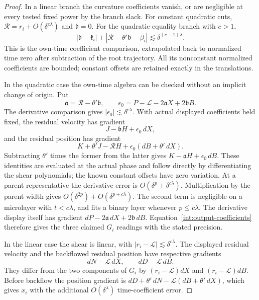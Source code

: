 \begin{proof}
In a linear branch the curvature coefficients vanish, or are
negligible at every tested fixed power by the branch slack. For
constant quadratic cuts,
$\mathcal R=r_i+O(\delta^{c\lambda})$ and $\mathfrak b=0$.
For the quadratic equality branch with $c>1$,
\begin{equation}\label{int:output-coefficients}
 |\mathfrak b-\mathfrak k_i|+
 |\mathcal R-\theta'\mathfrak b-\beta_i|
 \lesssim\delta^{(c-1)\lambda}.
\end{equation}
This is the own-time coefficient comparison, extrapolated back
to normalized time zero after subtraction of the root trajectory.
All its nonconstant normalized coefficients are bounded; constant
offsets are retained exactly in the translations.

In the quadratic case the own-time algebra can be
checked without an implicit change of origin. Put
\[
 \mathfrak a=\mathcal R-\theta'\mathfrak b,\qquad
 \epsilon_0=P-\mathcal L-2\mathfrak aX+2\mathfrak bB.
\]
The derivative comparison gives
$|\epsilon_0|\lesssim\delta^{c\lambda}$.
With actual displayed coefficients held fixed, the
residual velocity has gradient
\[
 J-\mathfrak bH+\epsilon_0\,dX,
\]
and the residual position has gradient
\[
 K+\theta'J-\mathcal RH+\epsilon_0(dB+\theta'\,dX).
\]
Subtracting $\theta'$ times the former from the
latter gives $K-\mathfrak aH+\epsilon_0\,dB$.
These identities are evaluated at the actual phase
and follow directly by differentiating the shear
polynomials; the known constant offsets have zero
variation. At a parent representative the derivative
error is $O(\delta^p+\delta^{c\lambda})$.
Multiplication by the parent width gives
$O(\delta^{2p})+O(\delta^{p+c\lambda})$.
The second term is negligible on a microlayer
with $t<c\lambda$, and fits a binary layer
whenever $p\leq c\lambda$.
The derivative display itself
has gradient $dP-2\mathfrak a\,dX+2\mathfrak b\,dB$.
Equation~\eqref{int:output-coefficients} therefore
gives the three claimed $G_i$ readings with the
stated precision.

In the linear case the shear is linear, with
$|r_i-\mathcal L|\lesssim\delta^{c\lambda}$.
The displayed residual velocity and the backflowed
residual position have respective gradients
\[
 dN-\mathcal L\,dX,
 \qquad dD-\mathcal L\,dB.
\]
They differ from the two components of $G_i$
by $(r_i-\mathcal L)dX$ and
$(r_i-\mathcal L)dB$. Before backflow the
position gradient is
$dD+\theta'\,dN-\mathcal L(dB+\theta'\,dX)$,
which gives $x_i$ with the additional
$O(\delta^\lambda)$ time-coefficient error.


\end{proof}
